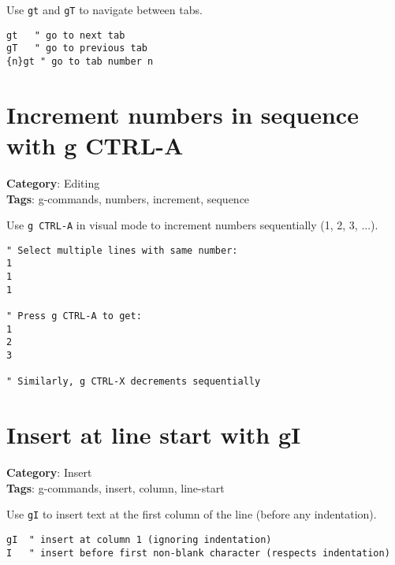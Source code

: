 {{{{{{Use {\footnotesize \Verb§gt§} and {\footnotesize \Verb§gT§} to navigate between tabs.

\begin{Exa*}{}
\begin{Verbatim}[fontsize=\footnotesize, breaklines, breakanywhere]
gt   " go to next tab
gT   " go to previous tab
{n}gt " go to tab number n
\end{Verbatim}
\end{Exa*}

\section{Increment numbers in sequence with g CTRL-A}

\textbf{Category}: Editing\\ \textbf{Tags}: g-commands, numbers, increment, sequence
\vspace{0.5cm}

Use {\footnotesize \Verb§g CTRL-A§} in visual mode to increment numbers sequentially (1, 2, 3, ...).

\begin{Exa*}{}
\begin{Verbatim}[fontsize=\footnotesize, breaklines, breakanywhere]
" Select multiple lines with same number:
1
1
1

" Press g CTRL-A to get:
1
2
3

" Similarly, g CTRL-X decrements sequentially
\end{Verbatim}
\end{Exa*}

\section{Insert at line start with gI}

\textbf{Category}: Insert\\ \textbf{Tags}: g-commands, insert, column, line-start
\vspace{0.5cm}

Use {\footnotesize \Verb§gI§} to insert text at the first column of the line (before any indentation).

\begin{Exa*}{}
\begin{Verbatim}[fontsize=\footnotesize, breaklines, breakanywhere]
gI  " insert at column 1 (ignoring indentation)
I   " insert before first non-blank character (respects indentation)
\end{Verbatim}
\end{Exa*}

}}}}}}
